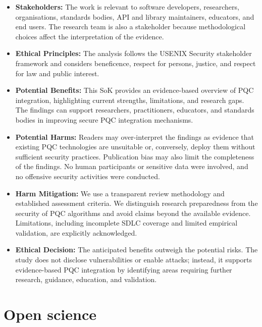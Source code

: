 \documentclass[letterpaper,twocolumn,10pt]{article}
\begin{document}
\begin{itemize}
    \item \textbf{Stakeholders:} The work is relevant to software developers, researchers, organisations, standards bodies, API and library maintainers, educators, and end users. The research team is also a stakeholder because methodological choices affect the interpretation of the evidence.
    
    \item \textbf{Ethical Principles:} The analysis follows the USENIX Security stakeholder framework and considers beneficence, respect for persons, justice, and respect for law and public interest.
    
    \item \textbf{Potential Benefits:} This SoK provides an evidence-based overview of PQC integration, highlighting current strengths, limitations, and research gaps. The findings can support researchers, practitioners, educators, and standards bodies in improving secure PQC integration mechanisms.
    
    \item \textbf{Potential Harms:} Readers may over-interpret the findings as evidence that existing PQC technologies are unsuitable or, conversely, deploy them without sufficient security practices. Publication bias may also limit the completeness of the findings. No human participants or sensitive data were involved, and no offensive security activities were conducted.
    
    \item \textbf{Harm Mitigation:} We use a transparent review methodology and established assessment criteria. We distinguish research preparedness from the security of PQC algorithms and avoid claims beyond the available evidence. Limitations, including incomplete SDLC coverage and limited empirical validation, are explicitly acknowledged.
    
    \item \textbf{Ethical Decision:} The anticipated benefits outweigh the potential risks. The study does not disclose vulnerabilities or enable attacks; instead, it supports evidence-based PQC integration by identifying areas requiring further research, guidance, education, and validation.
\end{itemize}

\section*{Open science}
\end{document}
